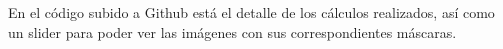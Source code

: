 En el código subido a Github está el detalle de los cálculos realizados, así como un slider para poder ver las imágenes con sus correspondientes máscaras.












